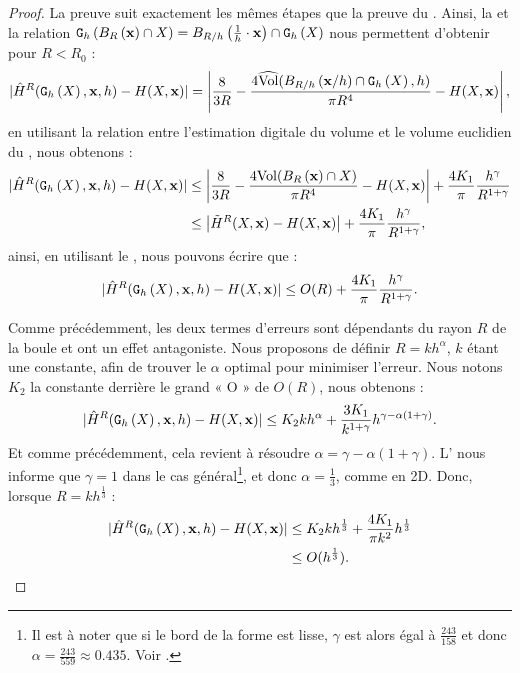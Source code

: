 \begin{proof}
  La preuve suit exactement les mêmes étapes que la preuve du
  . Ainsi, la
   et la relation
  $\DigF{\Ball{R}{\vx} \cap \Shape}{h}=\Ball{R/h}{\frac{1}{h} \cdot \vx} \cap \DSh$ nous
  permettent d'obtenir pour $R < R_0$ :
  \begin{equation}
    | \MeanCurvH{R}(\DSh,\vx,h) - \MeanCurv(\Shape,\vx) |
    = \left|\frac{8}{3R}-\frac{4\VolC(\Ball{R/h}{\vx / h} \cap \DSh, h)}{\pi R^4} - \MeanCurv(\Shape,\vx) \right|,
  \end{equation}
  en utilisant la relation entre l'estimation digitale du volume et le volume
  euclidien du , nous obtenons :
  \begin{align}\label{eq-meancurvhat-error-bound-prelim}
    | \MeanCurvH{R}(\DSh,\vx,h) - \MeanCurv(\Shape,\vx) |
    &\le \left|\frac{8}{3R}-\frac{4\Vol(\Ball{R}{\vx} \cap \Shape)}{\pi R^4} - \MeanCurv(\Shape,\vx) \right| + \frac{4 K_1}{\pi} \frac{h^\gamma}{R^{1+\gamma}} \nonumber \\
    &\le \left|\MeanCurvT{R}(\Shape,\vx) - \MeanCurv(\Shape,\vx) \right| + \frac{4 K_1}{\pi} \frac{h^\gamma}{R^{1+\gamma}},
  \end{align}
  ainsi, en utilisant le , nous pouvons
  écrire que :
  \begin{equation}\label{eq-meancurvhat-error-bound-prelim2}
    | \MeanCurvH{R}(\DSh,\vx,h) - \MeanCurv(\Shape,\vx) |
    \le O(R) + \frac{4 K_1}{\pi} \frac{h^\gamma}{R^{1+\gamma}}.
  \end{equation}

  Comme précédemment, les deux termes d'erreurs sont dépendants du rayon $R$ de
  la boule et ont un effet antagoniste. Nous proposons de définir $R = k h^{\alpha}$,
  $k$ étant une constante, afin de trouver le $\alpha$ optimal pour minimiser
  l'erreur. Nous notons $K_2$ la constante derrière le grand « O » de $O(R)$,
  nous obtenons :
  \begin{equation}\label{eq-meancurvhat-error-bound-prelim3}
    | \MeanCurvH{R}(\DSh,\vx,h) - \MeanCurv(\Shape,\vx) |
    \le K_2kh^\alpha + \frac{3K_1}{k^{1+\gamma}}h^{\gamma - \alpha(1+\gamma)}.
  \end{equation}
  Et comme précédemment, cela revient à résoudre $\alpha = \gamma -
  \alpha(1+\gamma)$. L' nous informe que
  $\gamma = 1$ dans le cas général\footnote{Il est à noter que si le bord de la
  forme est lisse, $\gamma$ est alors égal à $\frac{243}{158}$ et donc $\alpha =
  \frac{243}{559} \approx 0.435$. Voir .}, et
  donc $\alpha = \frac{1}{3}$, comme en 2D. Donc, lorsque $R=kh^{\frac{1}{3}}$ :
  \begin{align}\label{eq-meancurvhat-error-bound-prelim4}
    | \MeanCurvH{R}(\DSh,\vx,h) - \MeanCurv(\Shape,\vx) |
    &\le K_2kh^\frac{1}{3} + \frac{4K_1}{\pi k^2}h^{\frac{1}{3}}\\
    &\le O(h^\frac{1}{3}).
  \end{align}
\end{proof}

